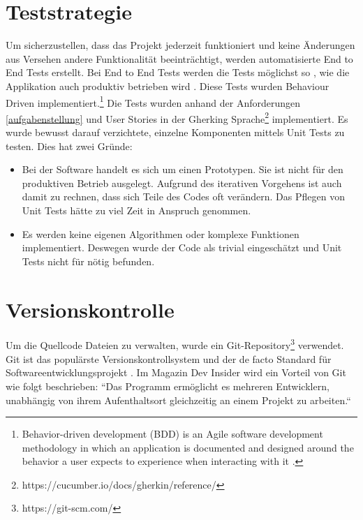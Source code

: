 \section{Teststrategie}
\label{teststrategie}

Um sicherzustellen, dass das Projekt jederzeit funktioniert und keine Änderungen
aus Versehen andere Funktionalität beeinträchtigt, werden automatisierte
End to End Tests erstellt. Bei End to End Tests werden die Tests möglichst
so , wie die Applikation auch produktiv betrieben wird \parencite{georgian_2021}.
Diese Tests wurden Behaviour Driven implementiert.\footnote{
      Behavior-driven development (BDD) is an Agile software development methodology
      in which an application is documented and designed around the behavior a user
      expects to experience when interacting with it \parencite{what_is_bdd}.
}  Die Tests wurden anhand der Anforderungen \ref{aufgabenstellung}
und User Stories in der Gherking Sprache\footnote{https://cucumber.io/docs/gherkin/reference/} implementiert.
Es wurde bewusst darauf verzichtete, einzelne Komponenten mittels Unit Tests zu testen.
Dies hat zwei Gründe:
\begin{itemize}
      \item Bei der Software handelt es sich um einen Prototypen.
            Sie ist nicht für den produktiven Betrieb ausgelegt.
            Aufgrund des iterativen Vorgehens ist auch damit zu rechnen, dass sich Teile des Codes oft verändern.
            Das Pflegen von Unit Tests hätte zu viel Zeit in Anspruch genommen.
      \item Es werden keine eigenen Algorithmen oder komplexe Funktionen implementiert.
            Deswegen wurde der Code als trivial eingeschätzt und Unit Tests nicht für nötig befunden.
\end{itemize}



\section{Versionskontrolle}

Um die Quellcode Dateien zu verwalten, wurde ein Git-Repository\footnote{https://git-scm.com/} verwendet.
Git ist das populärste Versionskontrollsystem und der de facto Standard für Softwareentwicklungsprojekt \parencite{git}.
Im Magazin Dev Insider  wird ein Vorteil von Git wie folgt beschrieben:
``Das Programm ermöglicht es mehreren Entwicklern, unabhängig von ihrem Aufenthaltsort gleichzeitig an einem Projekt zu arbeiten.`` \cite{was_ist_git}

